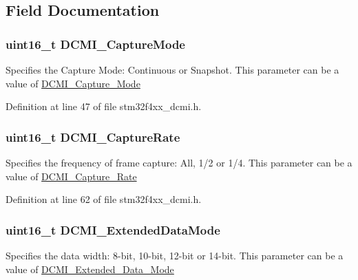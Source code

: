 \subsection{Field Documentation}
\hypertarget{struct_d_c_m_i___init_type_def_ad37548d24059a28369becd70badb3540}{
\subsubsection[{D\-C\-M\-I\-\_\-\-Capture\-Mode}]{\setlength{\rightskip}{0pt plus 5cm}uint16\-\_\-t D\-C\-M\-I\-\_\-\-Capture\-Mode}}\label{struct_d_c_m_i___init_type_def_ad37548d24059a28369becd70badb3540}
Specifies the Capture Mode\-: Continuous or Snapshot. This parameter can be a value of \hyperlink{group___d_c_m_i___capture___mode}{D\-C\-M\-I\-\_\-\-Capture\-\_\-\-Mode} 

Definition at line 47 of file stm32f4xx\-\_\-dcmi.\-h.

\hypertarget{struct_d_c_m_i___init_type_def_ac1e426f5f2fec2eff411c37230f2d6c5}{
\subsubsection[{D\-C\-M\-I\-\_\-\-Capture\-Rate}]{\setlength{\rightskip}{0pt plus 5cm}uint16\-\_\-t D\-C\-M\-I\-\_\-\-Capture\-Rate}}\label{struct_d_c_m_i___init_type_def_ac1e426f5f2fec2eff411c37230f2d6c5}
Specifies the frequency of frame capture\-: All, 1/2 or 1/4. This parameter can be a value of \hyperlink{group___d_c_m_i___capture___rate}{D\-C\-M\-I\-\_\-\-Capture\-\_\-\-Rate} 

Definition at line 62 of file stm32f4xx\-\_\-dcmi.\-h.

\hypertarget{struct_d_c_m_i___init_type_def_a42738931f709ed4db0864708515da3ad}{
\subsubsection[{D\-C\-M\-I\-\_\-\-Extended\-Data\-Mode}]{\setlength{\rightskip}{0pt plus 5cm}uint16\-\_\-t D\-C\-M\-I\-\_\-\-Extended\-Data\-Mode}}\label{struct_d_c_m_i___init_type_def_a42738931f709ed4db0864708515da3ad}
Specifies the data width\-: 8-\/bit, 10-\/bit, 12-\/bit or 14-\/bit. This parameter can be a value of \hyperlink{group___d_c_m_i___extended___data___mode}{D\-C\-M\-I\-\_\-\-Extended\-\_\-\-Data\-\_\-\-Mode} 

